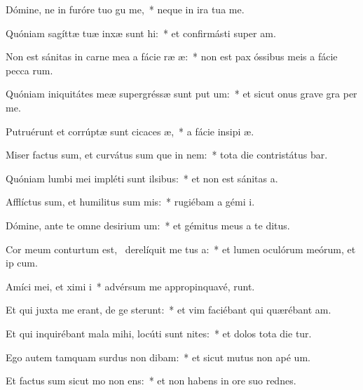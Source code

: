 \item Dómine, ne in furóre tuo gu me,~* neque in ira tua  me.
\item Quóniam sagíttæ tuæ inxæ sunt hi:~* et confirmásti super   am.
\item Non est sánitas in carne mea a fácie ræ æ:~* non est pax óssibus meis a fácie pecca rum.
\item Quóniam iniquitátes meæ supergréssæ sunt put um:~* et sicut onus grave gra  per me.
\item Putruérunt et corrúptæ sunt cicaces æ,~* a fácie insipi æ.
\item Miser factus sum, et curvátus sum que in nem:~* tota die contristátus bar.
\item Quóniam lumbi mei impléti sunt ilsibus:~* et non est sánitas   a.
\item Afflíctus sum, et humilitus sum mis:~* rugiébam a gémi  i.
\item Dómine, ante te omne desirium um:~* et gémitus meus a te   ditus.
\item Cor meum conturtum est,~\pscross{} derelíquit me tus a:~* et lumen oculórum meórum, et ip   cum.
\item Amíci mei, et ximi i~* advérsum me appropinquavé,  runt.
\item Et qui juxta me erant, de ge sterunt:~* et vim faciébant qui quærébant  am.
\item Et qui inquirébant mala mihi, locúti sunt nites:~* et dolos tota die tur.
\item Ego autem tamquam surdus non dibam:~* et sicut mutus non apé  um.
\item Et factus sum sicut mo non ens:~* et non habens in ore suo rednes.
